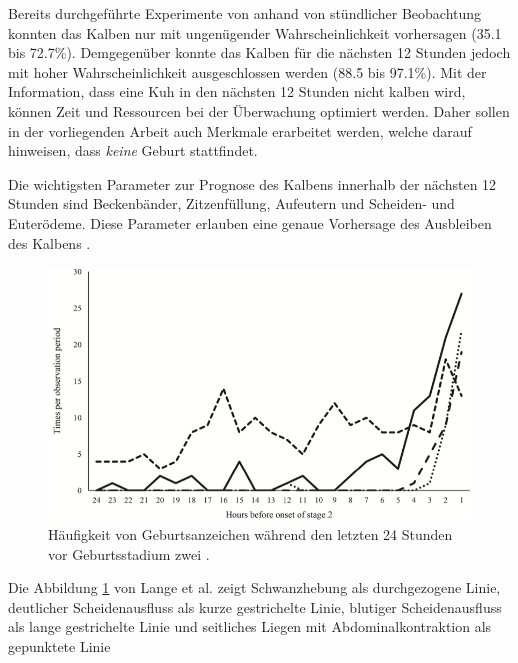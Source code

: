 Bereits durchgeführte Experimente von \citep[S. 4847]{Lange2017} anhand von stündlicher Beobachtung konnten das Kalben nur mit ungenügender Wahrscheinlichkeit  vorhersagen (35.1 bis 72.7\%). Demgegenüber konnte das Kalben für die nächsten 12 Stunden jedoch mit hoher Wahrscheinlichkeit ausgeschlossen werden (88.5 bis 97.1\%). Mit der Information, dass eine Kuh in den nächsten 12 Stunden nicht kalben wird, können Zeit und Ressourcen bei der Überwachung optimiert werden. Daher sollen in der vorliegenden Arbeit auch Merkmale erarbeitet werden, welche darauf hinweisen, dass \textit{keine} Geburt stattfindet.

Die wichtigsten Parameter zur Prognose des Kalbens innerhalb der nächsten 12 Stunden sind Beckenbänder, Zitzenfüllung,  Aufeutern und Scheiden- und Euterödeme. Diese Parameter erlauben eine genaue Vorhersage des Ausbleiben des Kalbens \citep[S. 180]{Streyl2011}.



\begin{figure}[H]
	\center
	\includegraphics[scale=.45]{Grafiken/observationTimes.png}
	\caption{Häufigkeit von Geburtsanzeichen während den letzten 24 Stunden vor Geburtsstadium zwei \citep[S.4851]{Lange2017}.}
	\label{fig: Häufigkeit von Geburtsanzeichen }
\end{figure}

Die Abbildung \ref{fig: Häufigkeit von Geburtsanzeichen } von Lange et al. zeigt Schwanzhebung als durchgezogene Linie, deutlicher Scheidenausfluss als kurze gestrichelte Linie,  blutiger Scheidenausfluss als lange gestrichelte Linie und seitliches Liegen mit Abdominalkontraktion als gepunktete Linie
